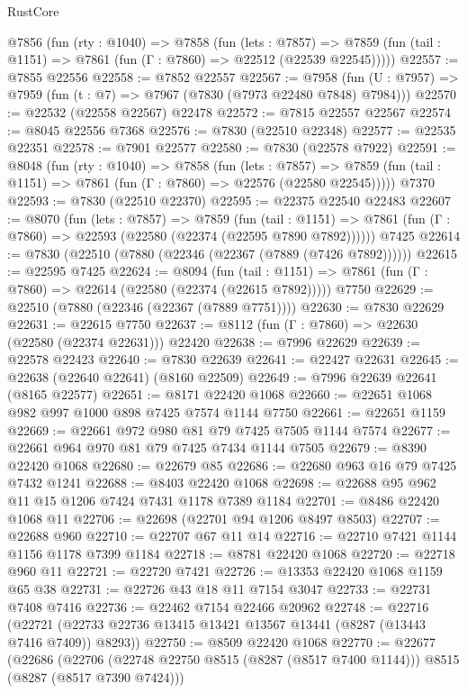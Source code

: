 \begin{lexlean}{RustCore}
\begin{coremodule}
  @7856
    (fun (rty : @1040) =>
    @7858
      (fun (lets : @7857) =>
      @7859 (fun (tail : @1151) => @7861 (fun (Γ : @7860) => @22512 (@22539 @22545)))))
@22557 := @7855 @22556
@22558 := @7852 @22557
@22567 := @7958
    (fun (U : @7957) => @7959 (fun (t : @7) => @7967 (@7830 (@7973 @22480 @7848) @7984)))
@22570 := @22532 (@22558 @22567) @22478
@22572 := @7815 @22557 @22567
@22574 := @8045 @22556 @7368
@22576 := @7830 (@22510 @22348)
@22577 := @22535 @22351
@22578 := @7901 @22577
@22580 := @7830 (@22578 @7922)
@22591 := @8048
    (fun (rty : @1040) =>
    @7858
      (fun (lets : @7857) =>
      @7859 (fun (tail : @1151) => @7861 (fun (Γ : @7860) => @22576 (@22580 @22545)))))
    @7370
@22593 := @7830 (@22510 @22370)
@22595 := @22375 @22540 @22483
@22607 := @8070
    (fun (lets : @7857) =>
    @7859
      (fun (tail : @1151) =>
      @7861 (fun (Γ : @7860) => @22593 (@22580 (@22374 (@22595 @7890 @7892))))))
    @7425
@22614 := @7830 (@22510 (@7880 (@22346 (@22367 (@7889 (@7426 @7892))))))
@22615 := @22595 @7425
@22624 := @8094
    (fun (tail : @1151) => @7861 (fun (Γ : @7860) => @22614 (@22580 (@22374 (@22615 @7892)))))
    @7750
@22629 := @22510 (@7880 (@22346 (@22367 (@7889 @7751))))
@22630 := @7830 @22629
@22631 := @22615 @7750
@22637 := @8112 (fun (Γ : @7860) => @22630 (@22580 (@22374 @22631))) @22420
@22638 := @7996 @22629
@22639 := @22578 @22423
@22640 := @7830 @22639
@22641 := @22427 @22631
@22645 := @22638 (@22640 @22641) (@8160 @22509)
@22649 := @7996 @22639 @22641 (@8165 @22577)
@22651 := @8171 @22420 @1068
@22660 := @22651 @1068 @982 @997 @1000 @898 @7425 @7574 @1144 @7750
@22661 := @22651 @1159
@22669 := @22661 @972 @980 @81 @79 @7425 @7505 @1144 @7574
@22677 := @22661 @964 @970 @81 @79 @7425 @7434 @1144 @7505
@22679 := @8390 @22420 @1068
@22680 := @22679 @85
@22686 := @22680 @963 @16 @79 @7425 @7432 @1241
@22688 := @8403 @22420 @1068
@22698 := @22688 @95 @962 @11 @15 @1206 @7424 @7431 @1178 @7389 @1184
@22701 := @8486 @22420 @1068 @11
@22706 := @22698 (@22701 @94 @1206 @8497 @8503)
@22707 := @22688 @960
@22710 := @22707 @67 @11 @14
@22716 := @22710 @7421 @1144 @1156 @1178 @7399 @1184
@22718 := @8781 @22420 @1068
@22720 := @22718 @960 @11
@22721 := @22720 @7421
@22726 := @13353 @22420 @1068 @1159 @65 @38
@22731 := @22726 @43 @18 @11 @7154 @3047
@22733 := @22731 @7408 @7416
@22736 := @22462 @7154 @22466 @20962
@22748 := @22716
    (@22721 (@22733 @22736 @13415 @13421 @13567 @13441 (@8287 (@13443 @7416 @7409)) @8293))
@22750 := @8509 @22420 @1068
@22770 := @22677
    (@22686
      (@22706 (@22748 @22750 @8515 (@8287 (@8517 @7400 @1144))) @8515 (@8287 (@8517 @7390 @7424)))

\end{coremodule}
\end{lexlean}
